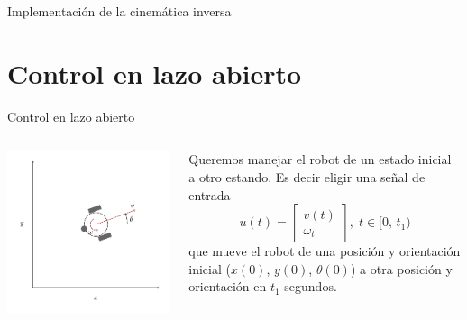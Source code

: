 \documentclass[presentation,aspectratio=169]{beamer}
\begin{document}
\begin{frame}[label={sec:orga89f409}]{Implementación de la cinemática inversa}
\end{frame}

\section{Control en lazo abierto}
\label{sec:orge3fe3e6}

\begin{frame}[label={sec:org3701b17}]{Control en lazo abierto}
\begin{columns}
\begin{column}{0.4\columnwidth}
\begin{center}
 \includegraphics[width=1.0\linewidth]{../figures/unicycle-model}
\end{center}
\end{column}

\begin{column}{0.6\columnwidth}
\pause

Queremos manejar el robot de un estado inicial a otro estando. Es decir eligir una señal de entrada
$$ u(t) = \begin{bmatrix} v(t)\\\omega_t \end{bmatrix}, \; t \in [0,\, t_1) $$
que mueve el robot de una posición y orientación inicial (\(x(0)\), \(y(0)\), \(\theta(0)\)) a otra posición y orientación en \(t_1\) segundos.


\end{column}
\end{columns}
\end{frame}
\end{document}
